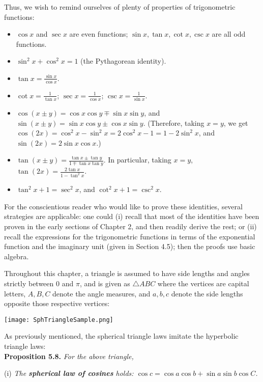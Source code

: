 \documentclass[leqno]{book}
\begin{document}
Thus, we wish to remind ourselves of plenty of properties of trigonometric functions:
\begin{itemize}
\item $\cos x$ and $\sec x$ are even functions; $\sin x,\tan x,\cot x,\csc x$ are all odd functions.

\item $\sin^2x+\cos^2x=1$ (the Pythagorean identity).

\item $\tan x=\frac{\sin x}{\cos x}$.

\item $\cot x=\frac 1{\tan x}$; $\sec x=\frac 1{\cos x}$; $\csc x=\frac 1{\sin x}$.

\item $\cos(x\pm y)=\cos x\cos y\mp\sin x\sin y$, and $\sin(x\pm y)=\sin x\cos y\pm\cos x\sin y$.  (Therefore, taking $x=y$, we get $\cos(2x)=\cos^2x-\sin^2x=2\cos^2x-1=1-2\sin^2x$, and $\sin(2x)=2\sin x\cos x$.)

\item $\tan(x\pm y)=\frac{\tan x\pm\tan y}{1\mp\tan x\tan y}$.  In particular, taking $x=y$, $\tan(2x)=\frac{2\tan x}{1-\tan^2x}$.

\item $\tan^2x+1=\sec^2x$, and $\cot^2x+1=\csc^2x$.
\end{itemize}
For the conscientious reader who would like to prove these identities, several strategies are applicable: one could (i) recall that most of the identities have been proven in the early sections of Chapter 2, and then readily derive the rest; or (ii) recall the expressions for the trigonometric functions in terms of the exponential function and the imaginary unit (given in Section 4.5); then the proofs use basic algebra.

Throughout this chapter, a triangle is assumed to have side lengths and angles strictly between $0$ and $\pi$, and is given as $\triangle ABC$ where the vertices are capital letters, $A,B,C$ denote the angle measures, and $a,b,c$ denote the side lengths opposite those respective vertices:
\begin{center}
\texttt{[image: SphTriangleSample.png]}
\end{center}
As previously mentioned, the spherical triangle laws imitate the hyperbolic triangle laws:\\

\noindent\textbf{Proposition 5.8.} \emph{For the above triangle,}

(i) \emph{The \textbf{spherical law of cosines} holds: $\cos c=\cos a\cos b+\sin a\sin b\cos C$.}
\end{document}
